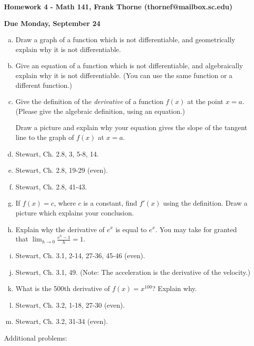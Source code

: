 \documentclass[12pt]{article}
\begin{document}
\setlength{\topmargin}{-2mm}





\begin{center}{\bf Homework 4 - Math 141, Frank Thorne (thornef@mailbox.sc.edu)}
\end{center}
\begin{center}
{\bf Due Monday, September 24}
\end{center}
\begin{enumerate}[(a)]

\item
Draw a graph of a function which is not differentiable, and geometrically explain why it is not differentiable.

\item
Give an equation of a function which is not differentiable, and algebraically explain why it is not differentiable.
(You can use the same function or a different function.)

\item
Give the definition of the {\itshape derivative} of a function
$f(x)$ at the point $x = a$. (Please give the algebraic definition,
using an equation.)

Draw a picture and explain why your
equation gives the slope of the tangent line to the graph of $f(x)$
at $x = a$.

\item
Stewart, Ch. 2.8, 3, 5-8, 14.
\item
Stewart, Ch. 2.8, 19-29 (even).
\item
Stewart, Ch. 2.8, 41-43.
\item
If $f(x) = c$, where $c$ is a constant, find $f'(x)$ using the definition.
Draw a picture which explains your conclusion.

\item
Explain why the derivative of $e^x$ is equal to $e^x$. You may take for granted that
$\lim_{h \rightarrow 0} \frac{e^h - 1}{h} = 1$.

\item
Stewart, Ch. 3.1, 2-14, 27-36, 45-46 (even).

\item
Stewart, Ch. 3.1, 49. (Note: The acceleration is the derivative of the velocity.)

\item
What is the 500th derivative of $f(x) = x^{100}$? Explain why.

\item
Stewart, Ch. 3.2, 1-18, 27-30 (even).

\item
Stewart, Ch. 3.2, 31-34 (even).
\end{enumerate}
Additional problems:
\end{document}
